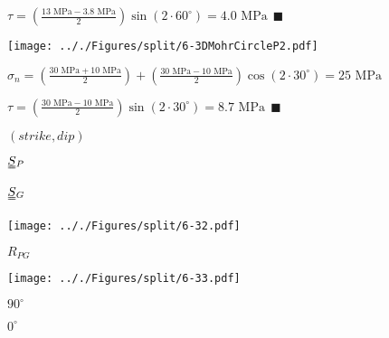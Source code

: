 \documentclass[onecolumn,11pt]{report}
\def\lthtmlcheckvsize{\ifdim\ht\sizebox<\vsize 
  \ifdim\wd\sizebox<\hsize\expandafter\hfill\fi \expandafter\vfill
  \else\expandafter\vss\fi}%
\begin{document}
{\newpage\clearpage
{}%
$\displaystyle \tau = \left( \frac{13 \text{ MPa} - 3.8 \text{ MPa}}{2} \right) \sin(2 \cdot 60^{\circ}) = 4.0 \text{ MPa} 
	\: \: \blacksquare
$%
\lthtmlindisplaymathZ
\lthtmlcheckvsize\clearpage}

{\newpage\clearpage
{}%
\texttt{[image: .././Figures/split/6-3DMohrCircleP2.pdf]}%
\lthtmlpictureZ
\lthtmlcheckvsize\clearpage}

{\newpage\clearpage
{}%
$\displaystyle \sigma_n = \left( \frac{30 \text{ MPa} + 10 \text{ MPa}}{2} \right) + \left( \frac{30 \text{ MPa} - 10 \text{ MPa}}{2} \right) \cos(2 \cdot 30^{\circ}) = 25 \text{ MPa}
$%
\lthtmlindisplaymathZ
\lthtmlcheckvsize\clearpage}

{\newpage\clearpage
{}%
$\displaystyle \tau = \left( \frac{30 \text{ MPa} - 10 \text{ MPa}}{2} \right) \sin(2 \cdot 30^{\circ}) = 8.7 \text{ MPa} 
	\: \: \blacksquare
$%
\lthtmlindisplaymathZ
\lthtmlcheckvsize\clearpage}

{\newpage\clearpage
{}%
$ (strike,dip)$%
\lthtmlindisplaymathZ
\lthtmlcheckvsize\clearpage}

{\newpage\clearpage
{}%
$ \uuline{S}{}_P$%
\lthtmlindisplaymathZ
\lthtmlcheckvsize\clearpage}

{\newpage\clearpage
{}%
$ \uuline{S}{}_G$%
\lthtmlindisplaymathZ
\lthtmlcheckvsize\clearpage}

{\newpage\clearpage
{}%
\texttt{[image: .././Figures/split/6-32.pdf]}%
\lthtmlpictureZ
\lthtmlcheckvsize\clearpage}

{\newpage\clearpage
{}%
$ R_{PG}$%
\lthtmlindisplaymathZ
\lthtmlcheckvsize\clearpage}

{\newpage\clearpage
{}%
\texttt{[image: .././Figures/split/6-33.pdf]}%
\lthtmlpictureZ
\lthtmlcheckvsize\clearpage}

{\newpage\clearpage
{}%
$ 90^{\circ}$%
\lthtmlindisplaymathZ
\lthtmlcheckvsize\clearpage}

{\newpage\clearpage
{}%
$ 0^{\circ}$%
\lthtmlindisplaymathZ
\lthtmlcheckvsize\clearpage}
\end{document}
